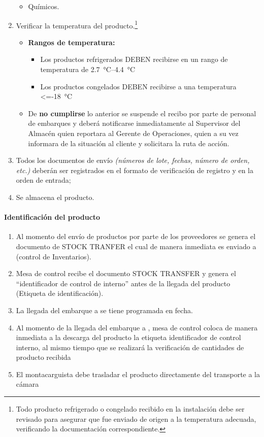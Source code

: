 \begin{enumerate}
\begin{itemize}
		\item Químicos.
	\end{itemize}
	\item Verificar la temperatura del producto.\footnote{Todo producto refrigerado o congelado recibido en la instalación debe ser revisado para asegurar que fue enviado de origen a la temperatura adecuada, verificando la documentación correspondiente.}
	\begin{itemize}
		\item \textbf{Rangos de temperatura:}
		\begin{itemize}
			\item Los productos refrigerados DEBEN recibirse en un rango de temperatura de \qtyrange{2.7}{4.4}{\degreeCelsius}
			\item Los productos congelados DEBEN recibirse a una temperatura \qty{<=-18}{\degreeCelsius}
		\end{itemize}
		\item De \textbf{no cumplirse} lo anterior se suspende el recibo por parte de personal de embarques y deberá notificarse inmediatamente al Supervisor del Almacén quien reportara al Gerente de Operaciones, quien a su vez informara de la situación al cliente y solicitara la ruta de acción.
	\end{itemize}
	\item Todos los documentos de envío \emph{(números de lote, fechas, número de orden, etc.)} deberán ser registrados en el formato de verificación de registro y en la orden de entrada;
	\item Se almacena el producto.
\end{enumerate}

\paragraph{Identificación del producto}

\begin{enumerate}
	\item Al momento del envío de productos por parte de los proveedores se genera el documento de STOCK TRANFER el cual de manera inmediata es enviado a  (control de Inventarios).
	\item Mesa de control recibe el documento STOCK TRANSFER y genera el “identificador de control de interno” antes de la llegada del producto (Etiqueta de identificación).
	\item La llegada del embarque a  se tiene programada en fecha.
	\item Al momento de la llegada del embarque a , mesa de control coloca de manera inmediata a la descarga del producto la etiqueta identificador de control interno, al mismo tiempo que se realizará la verificación de cantidades de producto recibida
	\item El montacarguista debe trasladar el producto directamente del transporte a la cámara
\end{enumerate}

